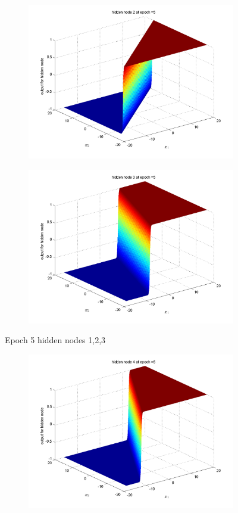 \documentclass{article}
\begin{document}
\begin{flushleft}
\begin{figure}
\begin{subfigure}{.3\textwidth}
\end{subfigure}%
\begin{subfigure}{.3\textwidth}
  \centering
  \includegraphics[width=.8\linewidth]{Classification/linearlySeparable/h5_2}
  
\end{subfigure}
\begin{subfigure}{.3\textwidth}
  \centering
  \includegraphics[width=.8\linewidth]{Classification/linearlySeparable/h5_3}
  
\end{subfigure}
\caption{Epoch 5 hidden nodes 1,2,3}
\end{figure}

\begin{figure}
\begin{subfigure}{.3\textwidth}
  \centering
  \includegraphics[width=.8\linewidth]{Classification/linearlySeparable/h5_4}
 

\end{subfigure}
\end{figure}
\end{flushleft}
\end{document}
